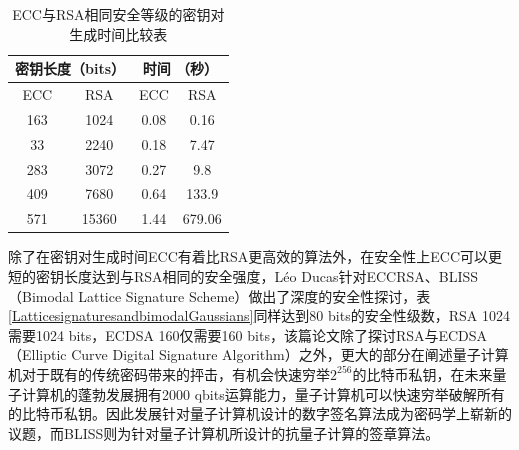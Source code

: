 				\begin{table}[!htbp]
				\centering
				\caption{ECC与RSA相同安全等级的密钥对生成时间比较表\supercite{Performancecomparisonofellipticcurveandrsadigitalsignatures}}
				\label{ECCtime}
				\begin{tabular}{|c|c|c|c|}
				\hline
				\multicolumn{2}{|c|}{密钥长度（bits）} & \multicolumn{2}{c|}{时间 （秒）} \\ \hline
				ECC & RSA & ECC & RSA \\ \hline
				163 & 1024 & 0.08 & 0.16 \\ \hline
				33 & 2240 & 0.18 & 7.47 \\ \hline
				283 & 3072 & 0.27 & 9.8 \\ \hline
				409 & 7680 & 0.64 & 133.9 \\ \hline
				571 & 15360 & 1.44 & 679.06 \\ \hline
				\end{tabular}
				\end{table}	

				除了在密钥对生成时间ECC有着比RSA更高效的算法外，在安全性上ECC可以更短的密钥长度达到与RSA相同的安全强度，Léo Ducas针对ECCRSA、BLISS（Bimodal Lattice Signature Scheme）\supercite{LatticesignaturesandbimodalGaussians}做出了深度的安全性探讨，表\ref{LatticesignaturesandbimodalGaussians}同样达到80 bits的安全性级数，RSA 1024需要1024 bits，ECDSA 160\supercite{DeploymentsofEllipticCurveCryptography}仅需要160 bits，该篇论文除了探讨RSA与ECDSA（Elliptic Curve Digital Signature Algorithm）之外，更大的部分在阐述量子计算机对于既有的传统密码带来的抨击，有机会快速穷举$2^{256}$的比特币私钥，在未来量子计算机的蓬勃发展拥有2000 qbits运算能力，量子计算机可以快速穷举破解所有的比特币私钥。因此发展针对量子计算机设计的数字签名算法成为密码学上崭新的议题，而BLISS则为针对量子计算机所设计的抗量子计算的签章算法。

